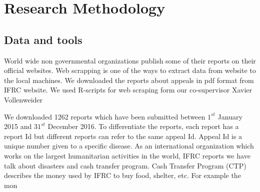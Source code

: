 \chapter{Research Methodology}
\section{Data and tools}
World wide non governmental organizations publish some of their reports on their official websites.  Web scrapping is one of the ways to extract data from website to the local machines. We downloaded the reports about appeals in pdf format from IFRC website. 
We used R-scripts for web scraping form our co-supervisor  Xavier Vollenweider 
 
We downloaded 1262 reports which have been submitted between $ 1^{st}$ January 2015 and $31^{st}$ December 2016. To differentiate the reports, each report has  a report Id but different reports can refer to the same appeal Id. Appeal Id is a unique number given to a  specific disease.
As an international organization which works
on the largest humanitarian  activities in the world,
IFRC reports we have talk about disasters and cash transfer program.
Cash Transfer Program (CTP) describes the money used by IFRC to buy food, shelter, etc. For example the mon
